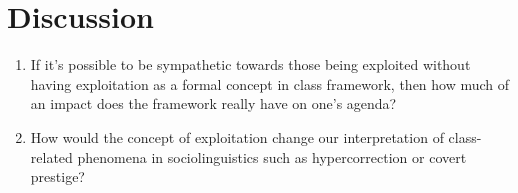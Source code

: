 \documentclass{article}
\begin{document}
  \section{Discussion}
    \begin{enumerate}
      \item If it's possible to be sympathetic towards those being exploited without having exploitation as a formal concept in class framework, then how much of an impact does the framework really have on one's agenda?
      \item How would the concept of exploitation change our interpretation of class-related phenomena in sociolinguistics such as hypercorrection or covert prestige?
    \end{enumerate}
\end{document}
